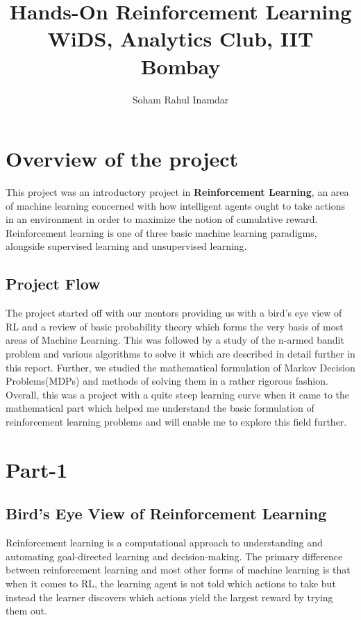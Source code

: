 \documentclass[12pt]{article}
\title{Hands-On Reinforcement Learning\\
\large WiDS, Analytics Club, IIT Bombay
}
\author{Soham Rahul Inamdar}
\begin{document}
\maketitle

 

\section{Overview of the project} 
This project was an introductory project in  \textbf{Reinforcement Learning}, an  area of machine learning concerned with how intelligent agents ought to take actions in an environment in order to maximize the notion of cumulative reward. Reinforcement learning is one of three basic machine learning paradigms, alongside supervised learning and unsupervised learning.

\subsection{Project Flow}%
The project started off with our mentors providing us with a bird's eye view of RL and a review of basic probability theory which forms the very basis of most areas of Machine Learning. This was followed by a study of the n-armed bandit problem and various algorithms to solve it which are described in detail further in this report. Further, we studied the mathematical formulation of Markov Decision Problems(MDPs) and methods of solving them in a rather rigorous fashion.
\noindent
Overall, this was a project with a quite steep learning curve when it came to the mathematical part which helped me understand the basic formulation of reinforcement learning problems and will enable me to explore this field further.




\section{Part-1}%
\subsection{Bird's Eye View of Reinforcement Learning}
Reinforcement learning is a computational approach to understanding and automating goal-directed learning and decision-making. The primary difference between reinforcement learning and most other forms of machine learning is that when it comes to RL, the learning agent is not told which actions to take but instead the learner discovers which actions yield the largest reward by trying them out.
\end{document}
